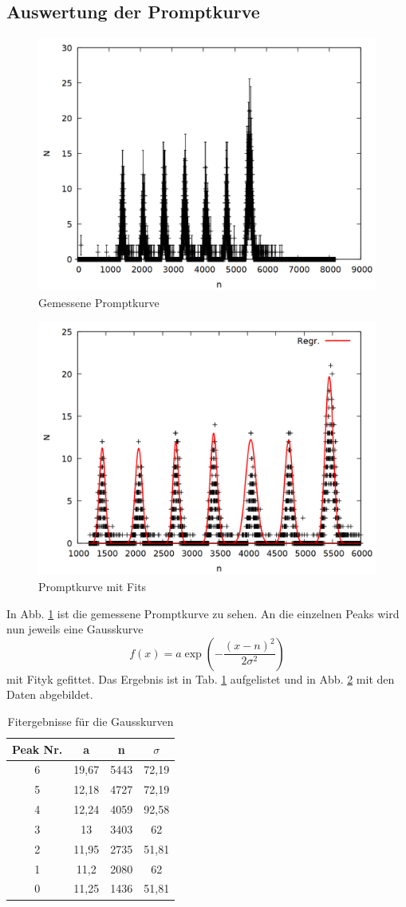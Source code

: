 \subsection{Auswertung der Promptkurve}

\begin{figure}[h]
\centering
\includegraphics[width=0.7\linewidth]{data/prompt.png}
\caption{Gemessene Promptkurve}
\label{fig:prompt}
\end{figure}

\begin{figure}[h]
\centering
\includegraphics[width=0.7\linewidth]{data/prompt2.png}
\caption{Promptkurve mit Fits}
\label{fig:prompt2}
\end{figure}

In Abb. \ref{fig:prompt} ist die gemessene Promptkurve zu sehen. An die einzelnen Peaks wird nun jeweils eine Gausskurve \[f(x) = a\exp{\left(-\frac{(x-n)^2}{2\sigma^2}\right)}\]mit Fityk gefittet. Das Ergebnis ist in Tab. \ref{tab:prompt} aufgelistet und in Abb. \ref{fig:prompt2} mit den Daten abgebildet.

\begin{table}[h]
\centering
\caption{Fitergebnisse für die Gausskurven}
\label{tab:prompt}
\begin{tabular}{cccc}
\toprule
Peak Nr. & a & n & $\sigma$\\
\midrule
6&	19,67&	5443&	72,19\\
5&	12,18&	4727&	72,19\\
4&	12,24&	4059&	92,58\\
3&	13&	3403&	62\\
2&	11,95&	2735&	51,81\\
1&	11,2&	2080&	62\\
0&	11,25&	1436&	51,81\\
\bottomrule
\end{tabular}
\end{table}

